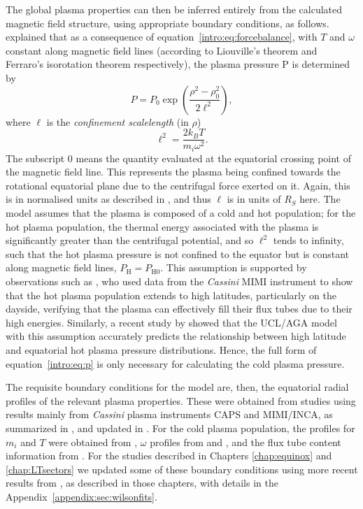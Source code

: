 The global plasma properties can then be inferred entirely from the calculated magnetic field structure, using appropriate boundary conditions, as follows. \citet{caudal1986} explained that as a consequence of equation~\ref{intro:eq:forcebalance}, with $T$ and $\omega$ constant along magnetic field lines (according to Liouville's theorem and Ferraro's isorotation theorem respectively), the plasma pressure P is determined by 
\begin{equation}\label{intro:eq:p}
P = P_{0}\exp\left(\frac{\rho^2-\rho_0^2}{2\ell^2}\right),
\end{equation}
where $\ell$ is the \textit{confinement scalelength} (in $\rho$)
\begin{equation}
\ell^2 = \frac{2k_BT}{m_i\omega^2}.
\end{equation}
The subscript 0 means the quantity evaluated at the equatorial crossing point of the magnetic field line. This represents the plasma being confined towards the rotational equatorial plane due to the centrifugal force exerted on it. Again, this is in normalised units as described in \citet{achilleos2010a}, and thus $\ell$ is in units of $\si{R_S}$ here. The model assumes that the plasma is composed of a cold and hot population; for the hot plasma population, the thermal energy associated with the plasma is significantly greater than the centrifugal potential, and so $\ell^2$ tends to infinity, such that the hot plasma pressure is not confined to the equator but is constant along magnetic field lines, $P_\mathrm{H} = P_\mathrm{H0}$. This assumption is supported by observations such as \citet{krimigis2007}, who used data from the \textit{Cassini} MIMI instrument to show that the hot plasma population extends to high latitudes, particularly on the dayside, verifying that the plasma can effectively fill their flux tubes due to their high energies. Similarly, a recent study by \citet{sergis2018} showed that the UCL/AGA model  with this assumption accurately predicts the relationship between high latitude and equatorial hot plasma pressure distributions. Hence, the full form of equation~\ref{intro:eq:p} is only necessary for calculating the cold plasma pressure.

The requisite boundary conditions for the model are, then, the equatorial radial profiles of the relevant plasma properties. These were obtained from studies using results mainly from \textit{Cassini} plasma instruments CAPS and MIMI/INCA, as summarized in \citet{achilleos2010a}, and updated in \citet{achilleos2010b}. For the cold plasma population, the profiles for $m_i$ and $T$ were obtained from \citet{wilson2008}, $\omega$ profiles from \citet{wilson2008} and \citet{kane2008}, and the flux tube content information from \citet{mcandrews2009}. For the studies described in Chapters \ref{chap:equinox} and \ref{chap:LTsectors} we updated some of these boundary conditions using more recent results from \citet{wilson2017}, as described in those chapters, with details in the Appendix~\ref{appendix:sec:wilsonfits}.

